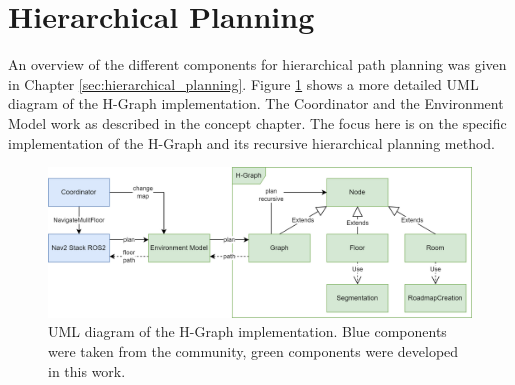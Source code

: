 \section{Hierarchical Planning}
\label{sec:impl_hierarchical_planning}
An overview of the different components for hierarchical path planning was given in Chapter \ref{sec:hierarchical_planning}. Figure \ref{fig:h_graph_uml} shows a more detailed UML diagram of the H-Graph implementation. The Coordinator and the Environment Model work as described in the concept chapter. The focus here is on the specific implementation of the H-Graph and its recursive hierarchical planning method.

\begin{figure}[h]
    \centering
    \includegraphics[width=\textwidth]{figures/50_implementation/h_graph_uml.png}
    \caption[UML diagram of the H-Graph implementation]{UML diagram of the H-Graph implementation. Blue components were taken from the community, green components were developed in this work.}
    \label{fig:h_graph_uml}
\end{figure}

